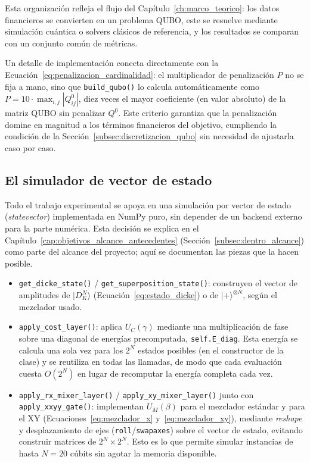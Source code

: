 Esta organización refleja el flujo del Capítulo~\ref{ch:marco_teorico}: los datos financieros se convierten en un problema QUBO, este se resuelve mediante simulación cuántica o solvers clásicos de referencia, y los resultados se comparan con un conjunto común de métricas.

Un detalle de implementación conecta directamente con la Ecuación~\eqref{eq:penalizacion_cardinalidad}: el multiplicador de penalización $P$ no se fija a mano, sino que \texttt{build\_qubo()} lo calcula automáticamente como $P = 10 \cdot \max_{i,j} |Q^0_{ij}|$, diez veces el mayor coeficiente (en valor absoluto) de la matriz QUBO sin penalizar $Q^0$. Este criterio garantiza que la penalización domine en magnitud a los términos financieros del objetivo, cumpliendo la condición de la Sección~\ref{subsec:discretizacion_qubo} sin necesidad de ajustarla caso por caso.

\subsection{El simulador de vector de estado}
\label{subsec:simulador-vector-estado}

Todo el trabajo experimental se apoya en una simulación por vector de estado (\textit{statevector}) implementada en NumPy puro, sin depender de un backend externo para la parte numérica. Esta decisión se explica en el Capítulo~\ref{cap:objetivos_alcance_antecedentes} (Sección~\ref{subsec:dentro_alcance}) como parte del alcance del proyecto; aquí se documentan las piezas que la hacen posible.

\begin{itemize}
    \item \texttt{get\_dicke\_state()} / \texttt{get\_superposition\_state()}: construyen el vector de amplitudes de $|D_K^N\rangle$ (Ecuación~\eqref{eq:estado_dicke}) o de $|+\rangle^{\otimes N}$, según el mezclador usado.
    \item \texttt{apply\_cost\_layer()}: aplica $U_C(\gamma)$ mediante una multiplicación de fase sobre una diagonal de energías precomputada, \texttt{self.E\_diag}. Esta energía se calcula una sola vez para los $2^N$ estados posibles (en el constructor de la clase) y se reutiliza en todas las llamadas, de modo que cada evaluación cuesta $O(2^N)$ en lugar de recomputar la energía completa cada vez.
    \item \texttt{apply\_rx\_mixer\_layer()} / \texttt{apply\_xy\_mixer\_layer()} junto con \texttt{apply\_xxyy\_gate()}: implementan $U_M(\beta)$ para el mezclador estándar y para el XY (Ecuaciones~\eqref{eq:mezclador_x} y~\eqref{eq:mezclador_xy}), mediante \textit{reshape} y desplazamiento de ejes (\texttt{roll}/\texttt{swapaxes}) sobre el vector de estado, evitando construir matrices de $2^N \times 2^N$. Esto es lo que permite simular instancias de hasta $N=20$ cúbits sin agotar la memoria disponible.
\end{itemize}

